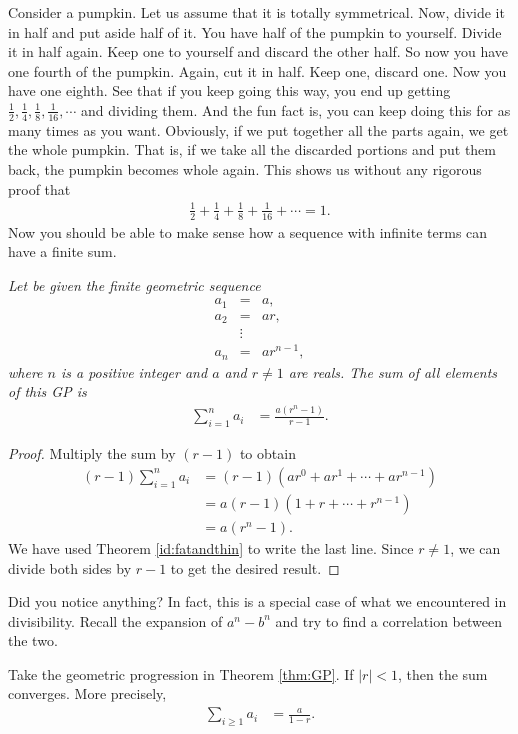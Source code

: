\documentclass{subfile}
\begin{document}
	Consider a pumpkin. Let us assume that it is totally symmetrical. Now, divide it in half and put aside half of it. You have half of the pumpkin to yourself. Divide it in half again. Keep one to yourself and discard the other half. So now you have one fourth of the pumpkin. Again, cut it in half. Keep one, discard one. Now you have one eighth. See that if you keep going this way, you end up getting $\frac{1}{2},\frac{1}{4},\frac{1}{8},\frac{1}{16},\cdots$ and dividing them. And the fun fact is, you can keep doing this for as many times as you want. Obviously, if we put together all the parts again, we get the whole pumpkin. That is, if we take all the discarded portions and put them back, the pumpkin becomes whole again. This shows us without any rigorous proof that
		\begin{align*}
			\frac{1}{2}+\frac{1}{4}+\frac{1}{8}+\frac{1}{16}+\cdots=1.
		\end{align*}
	Now you should be able to make sense how a sequence with infinite terms can have a finite sum.
		\begin{theorem}\slshape\label{thm:GP}
			Let be given the finite geometric sequence
				\begin{eqnarray*}
					a_1 & = & a,\\
					a_2 & = & ar,\\
					& \vdots &\\
					a_n & = & ar^{n-1},
				\end{eqnarray*}
			where $n$ is a positive integer and $a$ and $r \neq 1$ are reals. The sum of all elements of this GP is
				\begin{align*}
					\sum_{i=1}^{n} a_i &= \frac{a \left(r^n-1\right)}{r-1}.
				\end{align*}
		\end{theorem}
		
		\begin{proof}
			Multiply the sum by $(r-1)$ to obtain
				\begin{align*}
					(r-1)\sum_{i=1}^{n} a_i &= (r-1)(ar^0 + ar^1 + \cdots + ar^{n-1})\\
											&= a(r-1)(1+r+ \cdots + r^{n-1})\\
											&= a(r^n -1).
				\end{align*}
			We have used Theorem \ref{id:fatandthin} to write the last line. Since $r \neq 1$, we can divide both sides by $r-1$ to get the desired result.
		\end{proof}
	Did you notice anything? In fact, this is a special case of what we encountered in divisibility. Recall the expansion of $a^n-b^n$ and try to find a correlation between the two.
		\begin{corollary}
			Take the geometric progression in Theorem \ref{thm:GP}. If $|r|<1$, then the sum converges. More precisely,
				\begin{align*}
					\sum_{i\geq1} a_i &= \frac{a}{1-r}.
				\end{align*}
		\end{corollary}
		
\end{document}

